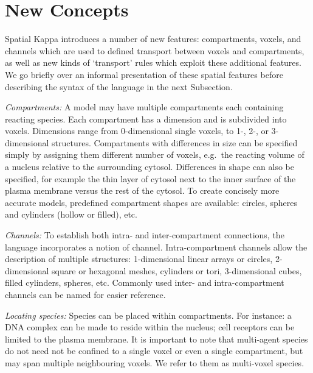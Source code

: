 \documentclass[english]{report}
\begin{document}
%

\section{New Concepts}


Spatial Kappa introduces a number of new features: compartments, voxels, and channels which are used to defined transport between voxels and compartments, as well as new kinds of `transport' rules which exploit these additional features. We go briefly over an informal presentation of these spatial features before describing the syntax of the language in the next Subsection.

\medskip\emph{Compartments:} A model may have multiple compartments each containing reacting species. Each compartment has a dimension and is subdivided into voxels. Dimensions range from 0-dimensional single voxels, to 1-, 2-, or 3-dimensional structures. Compartments with differences in size can be specified simply by assigning them different number of voxels, e.g.\ the reacting volume of a nucleus relative to the surrounding cytosol. Differences in shape can also be specified, for example the thin layer of cytosol next to the inner surface of the plasma membrane versus the rest of the cytosol. To create concisely more accurate models, predefined compartment shapes are available: circles, spheres and cylinders (hollow or filled), etc. 

\medskip\emph{Channels:} To establish both intra- and inter-compartment connections, the 
language incorporates a notion of channel. Intra-compartment channels allow the description of multiple structures: 1-dimensional linear arrays or circles, 2-dimensional square or hexagonal meshes, cylinders or tori, 3-dimensional cubes, filled cylinders, spheres, etc. Commonly used inter- and intra-compartment channels can be named for easier reference.

\medskip\emph{Locating species:} Species can be placed within compartments. For instance: a DNA complex can be made to reside within the nucleus; cell receptors can be limited to the plasma membrane. It is important to note that multi-agent species do not need not be confined to a single voxel or even a single compartment, but may span multiple neighbouring voxels. We refer to them as multi-voxel species.
\end{document}
